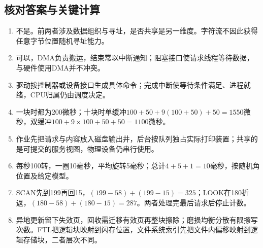 \subsection{核对答案与关键计算}\label{OS05-recall-answers}

{\begin{recallcard}[沿机制核对八个答案]

\begin{enumerate}
\def\labelenumi{\arabic{enumi}.}
\tightlist
\item
  不是。前两者涉及数据组织与寻址，是否共享是另一维度。字符流不因此获得任意字节位置随机寻址能力。
\item
  可以，DMA负责搬运，结束常以中断通知；阻塞接口使请求线程等待数据，与硬件使用DMA并不冲突。
\item
  驱动按控制器或设备接口生成具体命令；完成中断使等待条件满足、进程就绪，CPU归属仍由调度决定。
\item
  一块时都为200微秒；十块时单缓冲\(100+50+9(100+50)+50=1550\)微秒，双缓冲\(100+9\times100+50+50=1100\)微秒。
\item
  作业先把请求与内容放入磁盘输出井，后台按队列独占实际打印装置；共享的是可提交的服务视图，物理设备仍串行使用。
\item
  每秒100转，一圈10毫秒，平均旋转5毫秒；总计\(4+5+1=10\)毫秒，按随机角位置及给定模型。
\item
  SCAN先到199再回15，\((199-58)+(199-15)=325\)；LOOK在180折返，\((180-58)+(180-15)=287\)。两者处理完最后请求后停止计数。
\item
  异地更新留下失效页，回收需迁移有效页再整块擦除；磨损均衡分散有限擦写次数。FTL把逻辑块映射到闪存位置，文件系统索引先把文件内偏移映射到逻辑存储块，二者层次不同。
\end{enumerate}

\end{recallcard}}
